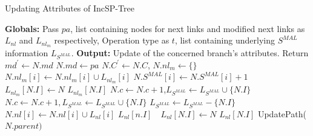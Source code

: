 \begin{algorithm}[!tb]
     \scriptsize %
    \caption{Updating Attributes of IncSP-Tree} \label{algorithm:update_inc_sp}
    \begin{algorithmic}[1]
        \State \textbf{Globals: }Pass $pa$, list containing nodes for next links and modified next links as $L_{nl}$ and $L_{nl_{m}}$ respectively, Operation type as $t$, list containing underlying $S^{MAL}$ information $L_{S^{MAL}}$.
        \State \textbf{Output: }Update of the concerned branch's attributes.
            \State Return 
            \EndIf
            \State $md^{\prime} \gets N.md$
             $N.md \gets pa$ 
             \State {}
                \State $N.C^{\prime} \gets N.C$, $N.nl_{m} \gets \{\}$
            \EndIf
                    \State {}
                    \State $N.nl_{m}[i] \gets N.nl_{m}[i] \cup L_{nl_{m}}[i]$
            \EndFor
            \State $N.S^{MAL}[i] \gets N.S^{MAL}[i]+1$ 
            \EndFor
             
                \State $L_{nl_{m}}[N.I] \gets N$ 
            \Else {}$L_{nl_{m}}[N.I]$ 
            \EndIf
            \State $N.c \gets N.c+1$,$L_{S^{MAL}} \gets L_{S^{MAL}} \cup \{N.I\}$
            \Else {}
                    \State $N.c \gets N.c+1,L_{S^{MAL}} \gets L_{S^{MAL}} \cup \{N.I\}$
                \Else {}
                    \State \text{ }$L_{S^{MAL}} \gets L_{S^{MAL}} - \{N.I\}$
                \EndIf
            \EndIf
             
            \State $N.nl[i] \gets N.nl[i] \cup L_{nl}[i]$
            \EndFor
             
                 
                    \State {}$L_{nl}[n.I]$
                \Else $\text{ }L_{nl}[N.I] \gets N$ 
                \EndIf
            \Else {}$L_{nl}[N.I]$ 
            \EndIf
            \State UpdatePath($N.parent)$
        \EndProcedure
    \end{algorithmic}
\end{algorithm}

